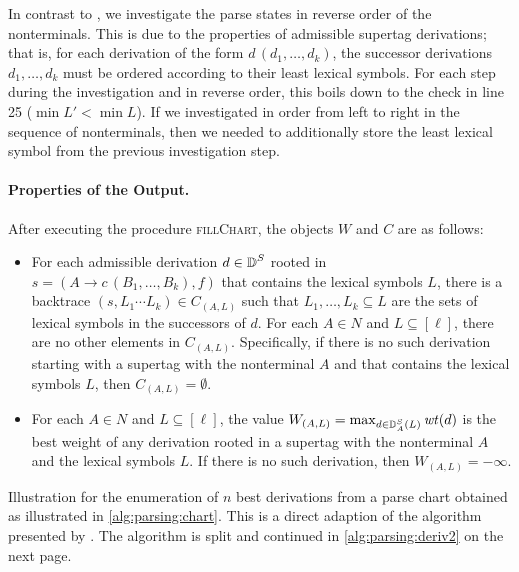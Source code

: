 \documentclass[../../document.tex]{subfiles}
\begin{document}
    In contrast to , we investigate the parse states in reverse order of the  nonterminals.
    This is due to the properties of admissible  supertag derivations; that is, for each derivation of the form \(d\,(d_1, \ldots, d_k)\), the successor derivations \(d_1, \ldots, d_k\) must be ordered according to their least lexical symbols.
    For each step during the investigation and in reverse order, this boils down to the check in line 25 (\(\min L' < \min L\)).
    If we investigated in order from left to right in the sequence of  nonterminals, then we needed to additionally store the least lexical symbol from the previous investigation step.

    \paragraph{Properties of the Output.} After executing the procedure \textsc{fillChart}, the objects \(W\) and \(C\) are as follows:
    \begin{itemize}
        \item
            For each admissible derivation \(d \in \operatorname{\mathbb{D}}^S\) rooted in \(s = (A \to c\,(B_1, \ldots, B_k), f)\) that contains the lexical symbols \(L\), there is a backtrace \((s, L_1 \cdots L_k) \in C_{(A, L)}\) such that \(L_1, \ldots, L_k \subseteq L\) are the sets of lexical symbols in the successors of \(d\).
            For each \(A\in N\) and \(L \subseteq [\ell]\), there are no other elements in \(C_{(A,L)}\).
            Specifically, if there is no such derivation starting with a supertag with the  nonterminal \(A\) and that contains the lexical symbols \(L\), then \(C_{(A,L)} = \emptyset\).
        \item
            For each \(A \in N\) and \(L \subseteq [\ell]\), the value \(W_{(A, L)} = \max_{d \in \operatorname{\mathbb{D}}^S_A(L)} \mathit{wt}(d)\) is the best weight of any derivation rooted in a supertag with the  nonterminal \(A\) and the lexical symbols \(L\).
            If there is no such derivation, then \(W_{(A, L)} = -\infty\).
    \end{itemize}

    \begin{algorithm}
        \caption{\label{alg:parsing:deriv}
            Illustration for the enumeration of $n$ best derivations from a parse chart obtained as illustrated in \cref{alg:parsing:chart}.
            This is a direct adaption of the algorithm presented by \citet{HuaChia05}.
            The algorithm is split and continued in \cref{alg:parsing:deriv2} on the next page.
        }
        
    \end{algorithm}
\end{document}
